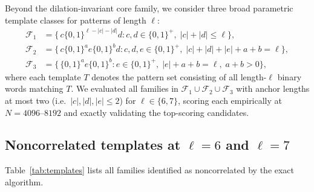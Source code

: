 \documentclass[11pt]{article}
\theoremstyle{definition}
\begin{document}
Beyond the dilation-invariant core family, we consider three
broad parametric template classes for patterns of length $\ell$:
\begin{align*}
  \mathcal{F}_1 &= \bigl\{\,c\{0,1\}^{\ell-|c|-|d|}d
                   : c,d \in \{0,1\}^+,\; |c|+|d| \leq \ell\bigr\}, \\
  \mathcal{F}_2 &= \bigl\{\,c\{0,1\}^a e\{0,1\}^b d
                   : c,d,e \in \{0,1\}^+,\; |c|+|d|+|e|+a+b = \ell\bigr\}, \\
  \mathcal{F}_3 &= \bigl\{\,\{0,1\}^a e\{0,1\}^b
                   : e \in \{0,1\}^+,\; |e|+a+b = \ell,\; a+b > 0\bigr\},
\end{align*}
where each template $T$ denotes the pattern set consisting of all
length-$\ell$ binary words matching $T$. We evaluated all families in
$\mathcal{F}_1 \cup \mathcal{F}_2 \cup \mathcal{F}_3$ with anchor
lengths at most two (i.e.\ $|c|, |d|, |e| \leq 2$) for $\ell \in \{6, 7\}$,
scoring each empirically at $N = 4096$--$8192$ and exactly validating the
top-scoring candidates.

\subsection{Noncorrelated templates at $\ell = 6$ and $\ell = 7$}

Table~\ref{tab:templates} lists all families identified as
noncorrelated by the exact algorithm.
\end{document}

